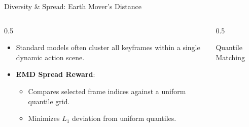 \documentclass[aspectratio=169]{beamer}
\begin{document}
\begin{frame}{Diversity \& Spread: Earth Mover's Distance}
    \begin{columns}
        \begin{column}{0.5\textwidth}
            \begin{itemize}
                \item Standard models often cluster all keyframes within a single dynamic action scene.
                \item \textbf{EMD Spread Reward}:
                \begin{itemize}
                    \item Compares selected frame indices against a uniform quantile grid.
                    \item Minimizes $L_1$ deviation from uniform quantiles.
                \end{itemize}
            \end{itemize}
        \end{column}
        \begin{column}{0.5\textwidth}
            \begin{block}{Quantile Matching}
                \centering
            \end{block}
        \end{column}
    \end{columns}
\end{frame}
\end{document}
